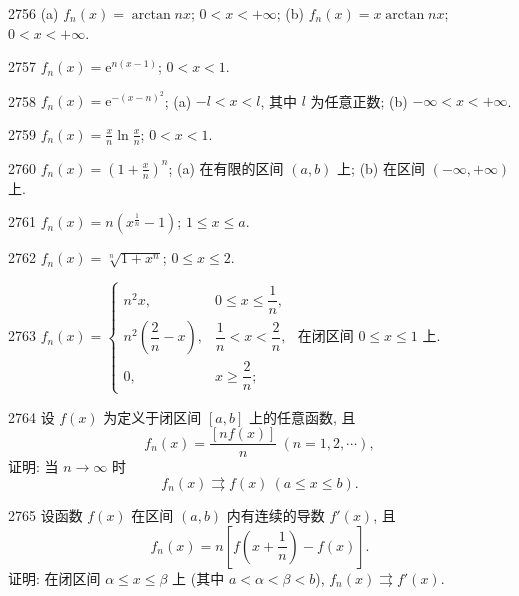 \begin{prob}[M]{2756}
(a) $f_n(x) = \arctan nx$; $0 < x < +\infty$; \qquad (b) $f_n(x) = x\arctan nx$; $0 < x < +\infty$.
\end{prob}

\begin{prob}[S]{2757}
$f_n(x) = \mathrm{e}^{n(x-1)}$; $0 < x < 1$.
\end{prob}

\begin{prob}[M]{2758}
$f_n(x) = \mathrm{e}^{-(x-n)^2}$; (a) $-l < x < l$, 其中 $l$ 为任意正数; \qquad (b) $-\infty < x < +\infty$.
\end{prob}

\begin{prob}[S]{2759}
$f_n(x) = \frac{x}{n}\ln\frac{x}{n}$; $0 < x < 1$.
\end{prob}

\begin{prob}[M]{2760}
$f_n(x) = \left(1+\frac{x}{n}\right)^n$; (a) 在有限的区间 $(a,b)$ 上; \qquad (b) 在区间 $(-\infty, +\infty)$ 上.
\end{prob}

\begin{prob}[S]{2761}
$f_n(x) = n\left(x^{\frac{1}{n}}-1\right)$; $1 \leqslant x \leqslant a$.
\end{prob}

\begin{prob}[S]{2762}
$f_n(x) = \sqrt[n]{1+x^n}$; $0 \leqslant x \leqslant 2$.
\end{prob}

\begin{prob}[M]{2763}
$f_n(x) = \begin{cases} n^2 x, & 0 \leqslant x \leqslant \dfrac{1}{n}, \\ n^2\left(\dfrac{2}{n}-x\right), & \dfrac{1}{n} < x < \dfrac{2}{n}, \\ 0, & x \geqslant \dfrac{2}{n}; \end{cases}$ 在闭区间 $0 \leqslant x \leqslant 1$ 上.
\end{prob}

\begin{prob}[M]{2764}
设 $f(x)$ 为定义于闭区间 $[a,b]$ 上的任意函数, 且
\[
f_n(x) = \frac{[nf(x)]}{n} \ (n=1,2,\cdots),
\]
证明: 当 $n\to\infty$ 时
\[
f_n(x) \rightrightarrows f(x) \ (a \leqslant x \leqslant b).
\]
\end{prob}

\begin{prob}[M]{2765}
设函数 $f(x)$ 在区间 $(a,b)$ 内有连续的导数 $f'(x)$, 且
\[
f_n(x) = n\left[f\left(x+\frac{1}{n}\right) - f(x)\right].
\]
证明: 在闭区间 $\alpha \leqslant x \leqslant \beta$ 上 (其中 $a < \alpha < \beta < b$), $f_n(x) \rightrightarrows f'(x)$.
\end{prob}

